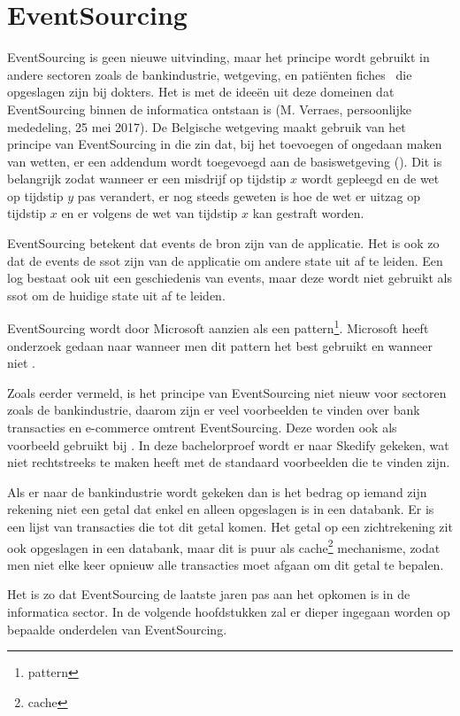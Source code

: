 
\chapter{EventSourcing}
\label{ch:eventsourcing}

EventSourcing is geen nieuwe uitvinding, maar het principe wordt gebruikt in andere sectoren zoals de bankindustrie, wetgeving, en patiënten fiches~\autocite{mann2003standards} die opgeslagen zijn bij dokters. Het is met de ideeën uit deze domeinen dat EventSourcing binnen de informatica ontstaan is (M. Verraes, persoonlijke mededeling, 25 mei 2017). De Belgische wetgeving maakt gebruik van het principe van EventSourcing in die zin dat, bij het toevoegen of ongedaan maken van wetten, er een addendum wordt toegevoegd aan de basiswetgeving (\cite{belgischewetgeving}). Dit is belangrijk zodat wanneer er een misdrijf op tijdstip $x$ wordt gepleegd en de wet op tijdstip $y$ pas verandert, er nog steeds geweten is hoe de wet er uitzag op tijdstip $x$ en er volgens de wet van tijdstip $x$ kan gestraft worden.

EventSourcing betekent dat events de bron zijn van de applicatie. Het is ook zo dat de events de \gls{ssot} zijn van de applicatie om andere \gls{state} uit af te leiden. Een log bestaat ook uit een geschiedenis van events, maar deze wordt niet gebruikt als \gls{ssot} om de huidige \gls{state} uit af te leiden.

EventSourcing wordt door Microsoft aanzien als een \gls{pattern}\footnote{\glsdesc{pattern}}. Microsoft heeft onderzoek gedaan naar wanneer men dit \gls{pattern} het best gebruikt en wanneer niet \autocite{Microsoft2017ES}.

Zoals eerder vermeld, is het principe van EventSourcing niet nieuw voor sectoren zoals de bankindustrie, daarom zijn er veel voorbeelden te vinden over bank transacties en e-commerce omtrent EventSourcing. Deze worden ook als voorbeeld gebruikt bij \textcite{Microsoft2017ES}. In deze bachelorproef wordt er naar Skedify gekeken, wat niet rechtstreeks te maken heeft met de standaard voorbeelden die te vinden zijn.

Als er naar de bankindustrie wordt gekeken dan is het bedrag op iemand zijn rekening niet een getal dat enkel en alleen opgeslagen is in een databank. Er is een lijst van transacties die tot dit getal komen. Het getal op een zichtrekening zit ook opgeslagen in een databank, maar dit is puur als \gls{cache}\footnote{\glsdesc{cache}} mechanisme, zodat men niet elke keer opnieuw alle transacties moet afgaan om dit getal te bepalen.

Het is zo dat EventSourcing de laatste jaren pas aan het opkomen is in de informatica sector. In de volgende hoofdstukken zal er dieper ingegaan worden op bepaalde onderdelen van EventSourcing.